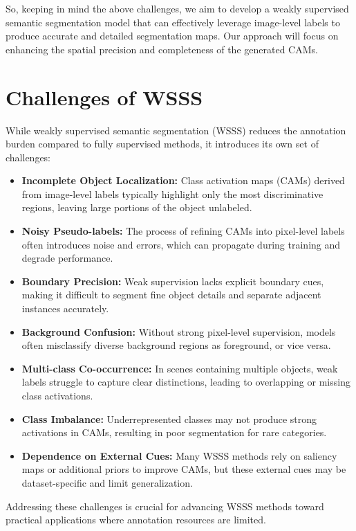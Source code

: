 So, keeping in mind the above challenges, we aim to develop a weakly supervised semantic segmentation model that can effectively leverage image-level labels to produce accurate and detailed segmentation maps. Our approach will focus on enhancing the spatial precision and completeness of the generated CAMs.

\section{Challenges of WSSS}
\label{sec:challenges_of_wsss}

While weakly supervised semantic segmentation (WSSS) reduces the annotation burden compared to fully supervised methods, it introduces its own set of challenges:

\begin{itemize}
    \item \textbf{Incomplete Object Localization:} Class activation maps (CAMs) derived from image-level labels typically highlight only the most discriminative regions, leaving large portions of the object unlabeled.
    \item \textbf{Noisy Pseudo-labels:} The process of refining CAMs into pixel-level labels often introduces noise and errors, which can propagate during training and degrade performance.
    \item \textbf{Boundary Precision:} Weak supervision lacks explicit boundary cues, making it difficult to segment fine object details and separate adjacent instances accurately.
    \item \textbf{Background Confusion:} Without strong pixel-level supervision, models often misclassify diverse background regions as foreground, or vice versa.
    \item \textbf{Multi-class Co-occurrence:} In scenes containing multiple objects, weak labels struggle to capture clear distinctions, leading to overlapping or missing class activations.
    \item \textbf{Class Imbalance:} Underrepresented classes may not produce strong activations in CAMs, resulting in poor segmentation for rare categories.
    \item \textbf{Dependence on External Cues:} Many WSSS methods rely on saliency maps or additional priors to improve CAMs, but these external cues may be dataset-specific and limit generalization.
\end{itemize}

Addressing these challenges is crucial for advancing WSSS methods toward practical applications where annotation resources are limited.


